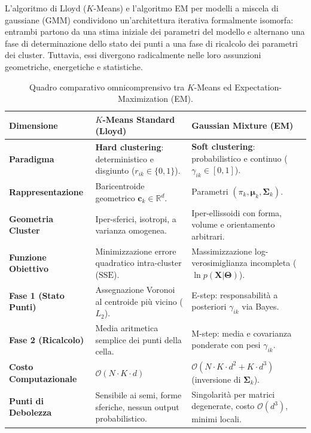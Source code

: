L'algoritmo di Lloyd ($K$-Means) e l'algoritmo EM per modelli a miscela di gaussiane (GMM) condividono un'architettura iterativa formalmente isomorfa: entrambi partono da una stima iniziale dei parametri del modello e alternano una fase di determinazione dello stato dei punti a una fase di ricalcolo dei parametri dei cluster. Tuttavia, essi divergono radicalmente nelle loro assunzioni geometriche, energetiche e statistiche.

\begin{table}[htbp]
    \centering
    \small
    \renewcommand{\arraystretch}{1.3}
    \begin{tabularx}{\textwidth}{>{\raggedright\arraybackslash\bfseries}p{3.3cm} Y Y}
        \toprule
        \textbf{Dimensione} & \textbf{$K$-Means Standard (Lloyd)} & \textbf{Gaussian Mixture (EM)} \\
        \midrule
        Paradigma & \textbf{Hard clustering}: deterministico e disgiunto ($r_{ik} \in \{0, 1\}$). & \textbf{Soft clustering}: probabilistico e continuo ($\gamma_{ik} \in [0, 1]$). \\
        \addlinespace[3pt]
        Rappresentazione & Baricentroide geometrico $\mathbf{c}_k \in \mathbb{R}^d$. & Parametri $(\pi_k, \boldsymbol{\mu}_k, \boldsymbol{\Sigma}_k)$. \\
        \addlinespace[3pt]
        Geometria Cluster & Iper-sferici, isotropi, a varianza omogenea. & Iper-ellissoidi con forma, volume e orientamento arbitrari. \\
        \addlinespace[3pt]
        Funzione Obiettivo & Minimizzazione errore quadratico intra-cluster ($\mathrm{SSE}$). & Massimizzazione log-verosimiglianza incompleta ($\ln p(\mathbf{X}|\boldsymbol{\Theta})$). \\
        \addlinespace[3pt]
        Fase 1 (Stato Punti) & Assegnazione Voronoi al centroide più vicino ($L_2$). & E-step: responsabilità a posteriori $\gamma_{ik}$ via Bayes. \\
        \addlinespace[3pt]
        Fase 2 (Ricalcolo) & Media aritmetica semplice dei punti della cella. & M-step: media e covarianza ponderate con pesi $\gamma_{ik}$. \\
        \addlinespace[3pt]
        Costo Computazionale & $\mathcal{O}(N \cdot K \cdot d)$ & $\mathcal{O}(N \cdot K \cdot d^2 + K \cdot d^3)$ (inversione di $\boldsymbol{\Sigma}_k$). \\
        \addlinespace[3pt]
        Punti di Debolezza & Sensibile ai semi, forme sferiche, nessun output probabilistico. & Singolarità per matrici degenerate, costo $\mathcal{O}(d^3)$, minimi locali. \\
        \bottomrule
    \end{tabularx}
    \caption{Quadro comparativo omnicomprensivo tra $K$-Means ed Expectation-Maximization (EM).}
    \label{tab:dm-kmeans-em-detailed-comparison}
\end{table}

